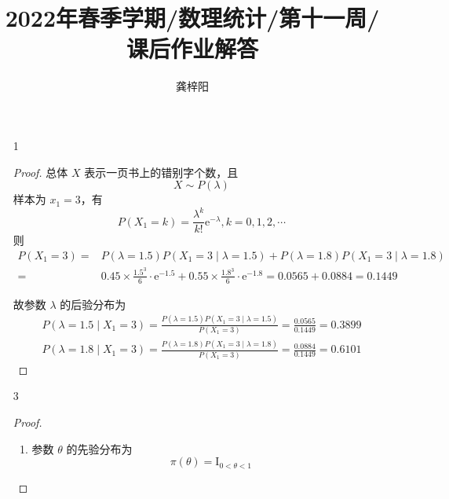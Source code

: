\documentclass[normal,cn]{elegantnote}
\title{2022年春季学期/数理统计/第十一周/课后作业解答}
\author{龚梓阳}
\date{\zhtoday}
\begin{document}
\maketitle
\begin{enumerate}
    \item[1]
        \begin{proof}
            总体 $X$ 表示一页书上的错别字个数，且
            \begin{equation*}
                X\sim P(\lambda)
            \end{equation*}
            样本为 $x_{1}=3$，有
            \begin{equation*}
                P\left(X_{1}=k\right)=\frac{\lambda^{k}}{k!}\mathrm{e}^{-\lambda},k=0,1,2,\cdots
            \end{equation*}
            则
            \begin{equation*}
                \begin{aligned}
                    P\left(X_{1}=3\right)= & P\left(\lambda=1.5\right)P\left(X_{1}=3\mid\lambda=1.5\right)+P\left(\lambda=1.8\right)P\left(X_{1}=3 \mid \lambda=1.8\right)    \\
                    =                      & 0.45 \times \frac{1.5^{3}}{6} \cdot \mathrm{e}^{-1.5}+0.55 \times \frac{1.8^{3}}{6} \cdot \mathrm{e}^{-1.8}=0.0565+0.0884=0.1449
                \end{aligned}
            \end{equation*}

            故参数 $\lambda$ 的后验分布为
            \begin{gather*}
                P\left(\lambda=1.5\mid X_{1}=3\right)=\frac{P\left(\lambda=1.5\right)P\left(X_{1}=3\mid \lambda=1.5\right)}{P\left(X_{1}=3\right)}=\frac{0.0565}{0.1449}=0.3899\\
                P\left(\lambda=1.8\mid X_{1}=3\right)=\frac{P\left(\lambda=1.8\right)P\left(X_{1}=3\mid \lambda=1.8\right)}{P\left(X_{1}=3\right)}=\frac{0.0884}{0.1449}=0.6101
            \end{gather*}
        \end{proof}
    \item[3]
        \begin{proof}
            \begin{enumerate}
                \item
                      参数 $\theta$ 的先验分布为
                      \begin{equation*}
                          \pi(\theta)=\mathrm{I}_{0<\theta<1}
                      \end{equation*}


\end{enumerate}
\end{proof}
\end{enumerate}
\end{document}
